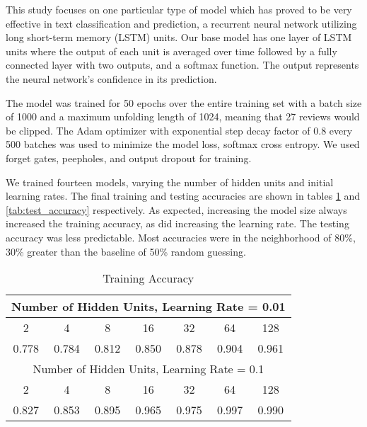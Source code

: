 \label{sec:rnn_results}
This study focuses on one particular type of model which has proved to be very effective in text classification and prediction, a recurrent neural network utilizing long short-term memory (LSTM) units.  Our base model has one layer of LSTM units where the output of each unit is averaged over time followed by a fully connected layer with two outputs, and a softmax function.  The output represents the neural network's confidence in its prediction.

The model was trained for 50 epochs over the entire training set with a batch size of 1000 and a maximum unfolding length of 1024, meaning that 27 reviews would be clipped.  The Adam optimizer with exponential step decay factor of 0.8 every 500 batches was used to minimize the model loss, softmax cross entropy.  We used forget gates, peepholes, and output dropout for training.  

We trained fourteen models, varying the number of hidden units and initial learning rates.  The final training and testing accuracies are shown in tables \ref{tab:train_accuracy} and \ref{tab:test_accuracy} respectively.  As expected, increasing the model size always increased the training accuracy, as did increasing the learning rate.  The testing accuracy was less predictable.  Most accuracies were in the neighborhood of 80\%, 30\% greater than the baseline of 50\% random guessing.

\begin{table}
\centering
\begin{tabular}{ |c|c|c|c|c|c|c|}
    \hline
    \multicolumn{7}{|c|}{Number of Hidden Units, Learning Rate = 0.01}\\ \hline
    2 & 4 & 8 & 16 & 32 & 64 & 128 \\ \hline
    0.778 & 0.784 & 0.812 & 0.850 & 0.878 & 0.904 & 0.961 \\ \hline
    \multicolumn{7}{|c|}{Number of Hidden Units, Learning Rate = 0.1}\\ \hline
    2 & 4 & 8 & 16 & 32 & 64 & 128 \\ \hline
    0.827 & 0.853 & 0.895 & 0.965 & 0.975 & 0.997 & 0.990 \\ \hline
\end{tabular}
\caption{Training Accuracy}
\label{tab:train_accuracy}
\end{table}

